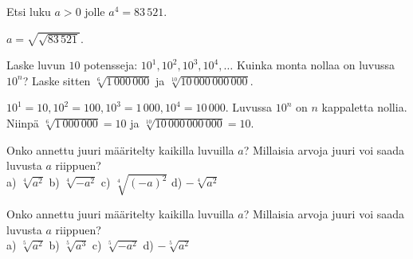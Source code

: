 \begin{tehtavasivu}
\begin{tehtava}
Etsi luku $a>0$ jolle $a^4=83\,521$.
\begin{vastaus}
$a=\sqrt{\sqrt{83\,521}}$.
\end{vastaus}
\end{tehtava}

\begin{tehtava}
Laske luvun $10$ potensseja: $10^1, 10^2, 10^3, 10^4, \ldots$ Kuinka monta nollaa on luvussa $10^n$? Laske sitten $\sqrt[6]{1\,000\,000}$ ja $\sqrt[10]{10\,000\,000\,000}$.

\begin{vastaus}
$10^1 = 10, 10^2 = 100, 10^3 = 1\,000, 10^4 = 10\,000$. Luvussa $10^n$ on $n$ kappaletta nollia. Niinpä $\sqrt[6]{1\,000\,000} = 10$ ja $\sqrt[10]{10\,000\,000\,000} = 10$.
\end{vastaus}
\end{tehtava}

\begin{tehtava}
Onko annettu juuri määritelty kaikilla luvuilla $a$? Millaisia arvoja juuri voi saada luvusta $a$ riippuen?\\
a) $\sqrt[4]{a^2}$ \quad b) $\sqrt[4]{-a^2}$ \quad c) $\sqrt[4]{(-a)^2}$ \quad d) $- \sqrt[4]{a^2}$

\begin{vastaus}

\end{vastaus}
\end{tehtava}

\begin{tehtava}
Onko annettu juuri määritelty kaikilla luvuilla $a$? Millaisia arvoja juuri voi saada luvusta $a$ riippuen?\\
a) $\sqrt[5]{a^2}$ \quad b) $\sqrt[5]{a^3}$ \quad c) $\sqrt[5]{-a^2}$ \quad d) $-\sqrt[5]{a^2}$

\begin{vastaus}


\end{vastaus}
\end{tehtava}
\end{tehtavasivu}
